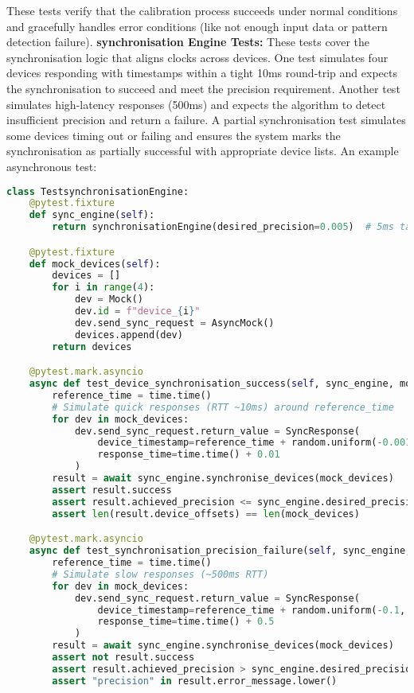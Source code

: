 \documentclass[11pt,a4paper]{report}
\begin{document}
These tests verify that the calibration process succeeds under normal conditions and gracefully handles error conditions (like not enough input data or pattern detection failure).
\textbf{synchronisation Engine Tests:} These tests cover the synchronisation logic that aligns clocks across devices. One test simulates four devices responding with timestamps within a tight 10ms round-trip and expects the synchronisation to succeed and meet the precision requirement. Another test simulates high-latency responses (500ms) and expects the algorithm to detect insufficient precision and return a failure. A partial synchronisation test simulates some devices timing out or failing and ensures the system marks the synchronisation as partially successful with appropriate device lists. An example asynchronous test:
\begin{lstlisting}[language=Python]
class TestsynchronisationEngine:
    @pytest.fixture  
    def sync_engine(self):  
        return synchronisationEngine(desired_precision=0.005)  # 5ms target

    @pytest.fixture  
    def mock_devices(self):  
        devices = []  
        for i in range(4):  
            dev = Mock()  
            dev.id = f"device_{i}"  
            dev.send_sync_request = AsyncMock()  
            devices.append(dev)  
        return devices

    @pytest.mark.asyncio  
    async def test_device_synchronisation_success(self, sync_engine, mock_devices):  
        reference_time = time.time()  
        # Simulate quick responses (RTT ~10ms) around reference_time  
        for dev in mock_devices:  
            dev.send_sync_request.return_value = SyncResponse(  
                device_timestamp=reference_time + random.uniform(-0.001, 0.001),  
                response_time=time.time() + 0.01  
            )  
        result = await sync_engine.synchronise_devices(mock_devices)  
        assert result.success  
        assert result.achieved_precision <= sync_engine.desired_precision  
        assert len(result.device_offsets) == len(mock_devices)

    @pytest.mark.asyncio  
    async def test_synchronisation_precision_failure(self, sync_engine, mock_devices):  
        reference_time = time.time()  
        # Simulate slow responses (~500ms RTT)  
        for dev in mock_devices:  
            dev.send_sync_request.return_value = SyncResponse(  
                device_timestamp=reference_time + random.uniform(-0.1, 0.1),  
                response_time=time.time() + 0.5  
            )  
        result = await sync_engine.synchronise_devices(mock_devices)  
        assert not result.success  
        assert result.achieved_precision > sync_engine.desired_precision  
        assert "precision" in result.error_message.lower()


\end{lstlisting}
\end{document}
